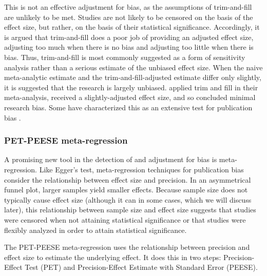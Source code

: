 \documentclass[man]{apa6}
\begin{document}
This is not an effective adjustment for bias, as the assumptions of trim-and-fill are unlikely to be met. Studies are not likely to be censored on the basis of the effect size, but rather, on the basis of their statistical significance. Accordingly, it is argued that trim-and-fill does a poor job of providing an adjusted effect size, adjusting too much when there is no bias and adjusting too little when there is bias. %
Thus, trim-and-fill is most commonly suggested as a form of sensitivity analysis rather than a serious estimate of the unbiased effect size. When the naive meta-analytic estimate and the trim-and-fill-adjusted estimate differ only slightly, it is suggested that the research is largely unbiased.
\citet{Anderson:etal:2014} applied trim and fill in their meta-analysis, received a slightly-adjusted effect size, and so concluded minimal research bias.  %
Some have characterized this as an extensive test for publication bias \citep{some-chucklehead}.  %

\subsubsection{PET-PEESE meta-regression}
A promising new tool in the detection of and adjustment for bias is meta-regression. Like Egger's test, meta-regression techniques for publication bias consider the relationship between effect size and precision. In an asymmetrical funnel plot, larger samples yield smaller effects. Because sample size does not typically cause effect size (although it can in some cases, which we will discuss later), this relationship between sample size and effect size suggests that studies were censored when not attaining statistical significance or that studies were flexibly analyzed in order to attain statistical significance. 

The PET-PEESE meta-regression \citep{Stanley:Doucouliagos:2013} %
uses the relationship between precision and effect size to estimate the underlying effect. It does this in two steps: Precision-Effect Test (PET) and Precision-Effect Estimate with Standard Error (PEESE). 
\end{document}
